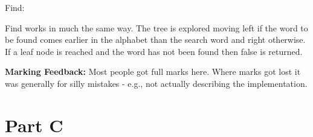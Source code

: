 \documentclass[a4]{article}
\newif\ifc
\newif\ifjava
\newif\ifpython
\begin{document}
\ifpython
\begin{verbatim}
def insert(self, value):
        if (self.tree()):
            if(value < self.value):
                self.left.insert(value)
            elif (value > self.value):
                self.right.insert(value)
        else:
            self.left = bstree();
            self.right = bstree();
            self.value = value;
\end{verbatim}
\fi



Find:
\ifc
\begin{verbatim}
if(tree){
    int comp = compare(value,tree->value);
    if(comp==0){ return true; }
    else if(comp < 0){ return find(value,tree->left); }
    else { return find(value,tree->right); }
  }
  // if tree is NULL then it contains no values
  return false;
\end{verbatim}
\fi

\ifjava
\begin{verbatim}
if(tree()){
            int comp = value.compareTo(this.value);
            if (comp == 0) { return true;}
            else if (comp < 0) {return left.find(value);}
            else return right.find(value);
        }
        // if tree is NULL then it contains no values
        return false;
\end{verbatim}
\fi

\ifpython
\begin{verbatim}
def find(self, value):
        if self.tree():
            if (value == self.value):
                return True
            elif (value < self.value):
                return self.left.find(value)
            else:
                return self.right.find(value)
        return False
\end{verbatim}
\fi

Find works in much the same way.  The tree is explored moving left if the word to be found comes earlier in the alphabet than the search word and right otherwise.  If a leaf node is reached and the word has not been found then false is returned.

{\bf Marking Feedback:}  Most people got full marks here.  Where marks got lost it was generally for silly mistakes - e.g., not actually describing the implementation.  


\section{Part C}



\end{document}
